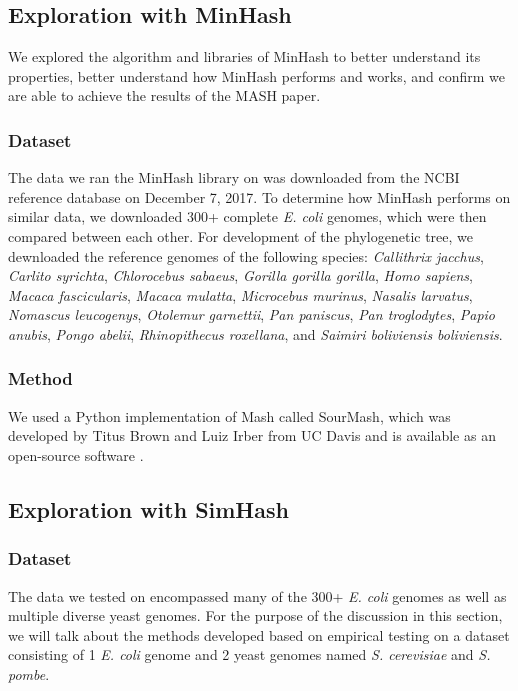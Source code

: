 \documentclass[12pt, letterpaper]{article}
\begin{document}
\subsection{Exploration with MinHash}

We explored the algorithm and libraries of MinHash to better understand its properties, better understand how MinHash performs and works, and confirm we are able to achieve the results of the MASH paper.

\subsubsection{Dataset}
The data we ran the MinHash library on was downloaded from the NCBI reference database on December 7, 2017. To determine how MinHash performs on similar data, we downloaded 300+ complete \textit{E. coli} genomes, which were then compared between each other. For development of the phylogenetic tree, we dewnloaded the reference genomes of the following species: \textit{Callithrix jacchus}, \textit{Carlito syrichta}, \textit{Chlorocebus sabaeus}, \textit{Gorilla gorilla gorilla}, \textit{Homo sapiens}, \textit{Macaca fascicularis}, \textit{Macaca mulatta}, \textit{Microcebus murinus}, \textit{Nasalis larvatus}, \textit{Nomascus leucogenys}, \textit{Otolemur garnettii}, \textit{Pan paniscus}, \textit{Pan troglodytes}, \textit{Papio anubis}, \textit{Pongo abelii}, \textit{Rhinopithecus roxellana}, and \textit{Saimiri boliviensis boliviensis}.

\subsubsection{Method}
We used a Python implementation of Mash called SourMash, which was developed by Titus Brown and Luiz Irber from UC Davis and is available as an open-source software \cite{GitHub-SourMash}.

\subsection{Exploration with SimHash}
\subsubsection{Dataset}
The data we tested on encompassed many of the 300+ \textit{E. coli} genomes as well as multiple diverse yeast genomes. For the purpose of the discussion in this section, we will talk about the methods developed based on empirical testing on a dataset consisting of 1 \textit{E. coli} genome and 2 yeast genomes named \textit{S. cerevisiae} and \textit{S. pombe}.
\end{document}
